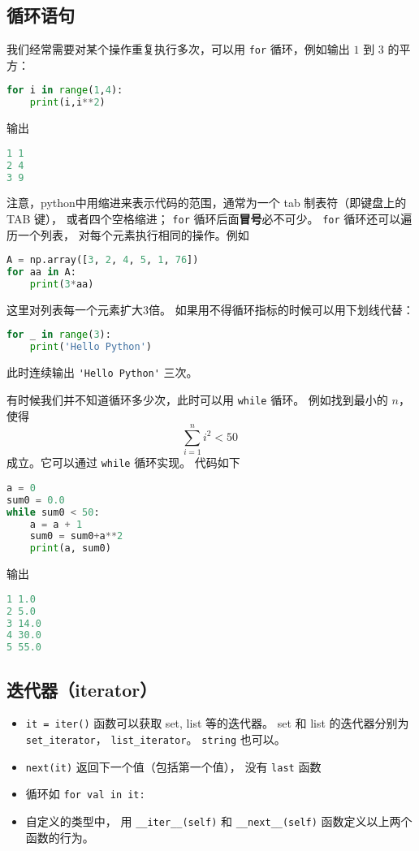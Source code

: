 \subsection{循环语句}
我们经常需要对某个操作重复执行多次，可以用 \verb`for` 循环，例如输出 $1$ 到 $3$ 的平方：
\begin{lstlisting}[language=python]
for i in range(1,4):
    print(i,i**2)
\end{lstlisting}
输出
\begin{lstlisting}[language=python]
1 1
2 4
3 9
\end{lstlisting}
注意，python中用缩进来表示代码的范围，通常为一个 tab 制表符（即键盘上的 TAB 键）， 或者四个空格缩进； \verb`for` 循环后面\textbf{冒号}必不可少。 \verb`for` 循环还可以遍历一个列表， 对每个元素执行相同的操作。例如
\begin{lstlisting}[language=python]
A = np.array([3, 2, 4, 5, 1, 76])
for aa in A:
    print(3*aa)
\end{lstlisting}
这里对列表每一个元素扩大3倍。 如果用不得循环指标的时候可以用下划线代替：
\begin{lstlisting}[language=python]
for _ in range(3):
    print('Hello Python')
\end{lstlisting}
此时连续输出   \verb`'Hello Python'`  三次。

有时候我们并不知道循环多少次，此时可以用 \verb`while` 循环。 例如找到最小的 $n$，使得
\begin{equation}
\sum_{i=1}^n i^2<50~
\end{equation}
成立。它可以通过 \verb`while` 循环实现。 代码如下
\begin{lstlisting}[language=python]
a = 0
sum0 = 0.0
while sum0 < 50:
    a = a + 1
    sum0 = sum0+a**2
    print(a, sum0)
\end{lstlisting}
输出
\begin{lstlisting}[language=python]
1 1.0
2 5.0
3 14.0
4 30.0
5 55.0
\end{lstlisting}

\subsection{迭代器（iterator）}
\begin{itemize}
\item \verb`it = iter()` 函数可以获取 set, list 等的迭代器。 set 和 list 的迭代器分别为 \verb`set_iterator`， \verb`list_iterator`。 \verb`string` 也可以。
\item \verb`next(it)` 返回下一个值（包括第一个值）， 没有 \verb`last` 函数
\item 循环如 \verb`for val in it:`
\item 自定义的类型中， 用 \verb`__iter__(self)` 和 \verb`__next__(self)` 函数定义以上两个函数的行为。
\end{itemize}
